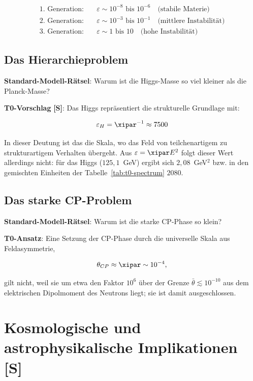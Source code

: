 	\begin{align}
		\text{1. Generation}: \quad &\varepsilon \sim 10^{-8} \text{ bis } 10^{-6} \quad \text{(stabile Materie)} \\
		\text{2. Generation}: \quad &\varepsilon \sim 10^{-3} \text{ bis } 10^{-1} \quad \text{(mittlere Instabilität)} \\
		\text{3. Generation}: \quad &\varepsilon \sim 1 \text{ bis } 10 \quad \text{(hohe Instabilität)}
	\end{align}
	
	\subsection{Das Hierarchieproblem}
	
	\textbf{Standard-Modell-Rätsel}: Warum ist die Higgs-Masse so viel kleiner als die Planck-Masse?
	
	\textbf{T0-Vorschlag} \textbf{[S]}: Das Higgs repräsentiert die strukturelle Grundlage mit:
	
	\begin{equation}
		\varepsilon_H = \xipar^{-1} \approx 7500
		\label{eq:higgs_epsilon}
	\end{equation}
	
	In dieser Deutung ist das die Skala, wo das Feld von teilchenartigem zu strukturartigem Verhalten übergeht. Aus $\varepsilon = \xipar E^2$ folgt dieser Wert allerdings nicht: für das Higgs ($125{,}1$~GeV) ergibt sich $2{,}08$~GeV$^2$ bzw. in den gemischten Einheiten der Tabelle~\ref{tab:t0-spectrum} $2080$.
	
	\subsection{Das starke CP-Problem}
	
	\textbf{Standard-Modell-Rätsel}: Warum ist die starke CP-Phase so klein?
	
	\textbf{T0-Ansatz}: Eine Setzung der CP-Phase durch die universelle Skala aus Feldasymmetrie,
	
	\begin{equation}
		\theta_{CP} \approx \xipar \sim 10^{-4},
		\label{eq:cp_phase}
	\end{equation}
	
	gilt nicht, weil sie um etwa den Faktor $10^6$ über der Grenze $\bar\theta \lesssim 10^{-10}$ aus dem elektrischen Dipolmoment des Neutrons liegt; sie ist damit ausgeschlossen.
	
	\section{Kosmologische und astrophysikalische Implikationen [S]}

